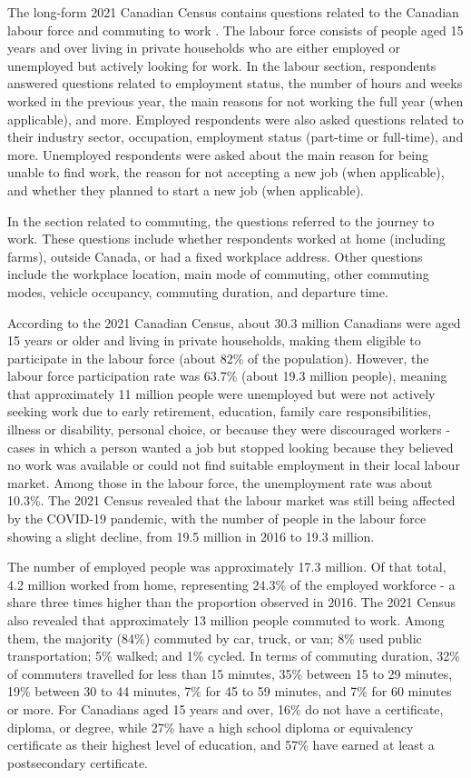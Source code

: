 \documentclass[sn-basic,lineno,pdflatex]{sn-jnl}
\begin{document}
The long-form 2021 Canadian Census contains questions related to the
Canadian labour force and commuting to work \citep{DictCensus2021}. The
labour force consists of people aged 15 years and over living in private
households who are either employed or unemployed but actively looking
for work. In the labour section, respondents answered questions related
to employment status, the number of hours and weeks worked in the
previous year, the main reasons for not working the full year (when
applicable), and more. Employed respondents were also asked questions
related to their industry sector, occupation, employment status
(part-time or full-time), and more. Unemployed respondents were asked
about the main reason for being unable to find work, the reason for not
accepting a new job (when applicable), and whether they planned to start
a new job (when applicable).

In the section related to commuting, the questions referred to the
journey to work. These questions include whether respondents worked at
home (including farms), outside Canada, or had a fixed workplace
address. Other questions include the workplace location, main mode of
commuting, other commuting modes, vehicle occupancy, commuting duration,
and departure time.

According to the 2021 Canadian Census, about 30.3 million Canadians were
aged 15 years or older and living in private households, making them
eligible to participate in the labour force (about 82\% of the
population). However, the labour force participation rate was 63.7\%
(about 19.3 million people), meaning that approximately 11 million
people were unemployed but were not actively seeking work due to early
retirement, education, family care responsibilities, illness or
disability, personal choice, or because they were discouraged workers -
cases in which a person wanted a job but stopped looking because they
believed no work was available or could not find suitable employment in
their local labour market. Among those in the labour force, the
unemployment rate was about 10.3\%. The 2021 Census revealed that the
labour market was still being affected by the COVID-19 pandemic, with
the number of people in the labour force showing a slight decline, from
19.5 million in 2016 to 19.3 million.

The number of employed people was approximately 17.3 million. Of that
total, 4.2 million worked from home, representing 24.3\% of the employed
workforce - a share three times higher than the proportion observed in
2016. The 2021 Census also revealed that approximately 13 million people
commuted to work. Among them, the majority (84\%) commuted by car,
truck, or van; 8\% used public transportation; 5\% walked; and 1\%
cycled. In terms of commuting duration, 32\% of commuters travelled for
less than 15 minutes, 35\% between 15 to 29 minutes, 19\% between 30 to
44 minutes, 7\% for 45 to 59 minutes, and 7\% for 60 minutes or more.
For Canadians aged 15 years and over, 16\% do not have a certificate,
diploma, or degree, while 27\% have a high school diploma or equivalency
certificate as their highest level of education, and 57\% have earned at
least a postsecondary certificate.
\end{document}
